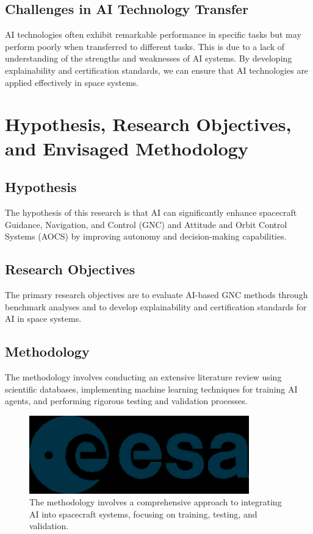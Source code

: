 \documentclass[a4paper,12pt]{article}
\begin{document}
\subsection{Challenges in AI Technology Transfer}

AI technologies often exhibit remarkable performance in specific tasks but may perform poorly when transferred to different tasks. This is due to a lack of understanding of the strengths and weaknesses of AI systems. By developing explainability and certification standards, we can ensure that AI technologies are applied effectively in space systems.

\newpage

\section{Hypothesis, Research Objectives, and Envisaged Methodology}

\subsection{Hypothesis}

The hypothesis of this research is that AI can significantly enhance spacecraft Guidance, Navigation, and Control (GNC) and Attitude and Orbit Control Systems (AOCS) by improving autonomy and decision-making capabilities.

\subsection{Research Objectives}

The primary research objectives are to evaluate AI-based GNC methods through benchmark analyses and to develop explainability and certification standards for AI in space systems.

\subsection{Methodology}

The methodology involves conducting an extensive literature review using scientific databases, implementing machine learning techniques for training AI agents, and performing rigorous testing and validation processes.

\begin{figure}[htbp]
    \centering
    \includegraphics[width=0.85\textwidth]{images/hypothesis,_research_objectives_and_envisaged_methodology_img_1.png}
    \caption{The methodology involves a comprehensive approach to integrating AI into spacecraft systems, focusing on training, testing, and validation.}
    \label{fig:hypothesis,_research_objectives_and_envisaged_methodology_1}
\end{figure}
\end{document}
